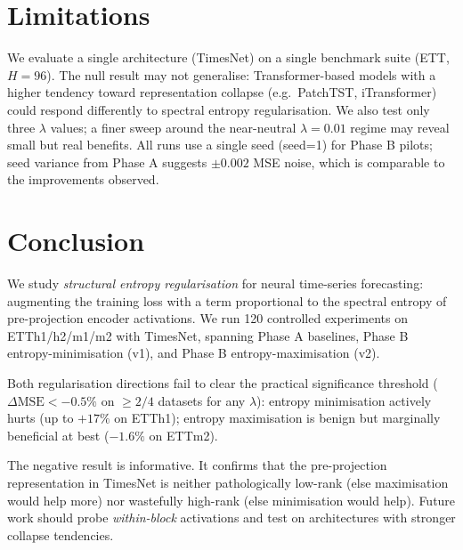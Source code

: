 \documentclass[10pt]{article}
\begin{document}
\section{Limitations}

We evaluate a single architecture (TimesNet) on a single benchmark suite
(ETT, $H=96$). The null result may not generalise: Transformer-based models
with a higher tendency toward representation collapse (e.g.\ PatchTST, iTransformer)
could respond differently to spectral entropy regularisation.
We also test only three $\lambda$ values; a finer sweep around the
near-neutral $\lambda=0.01$ regime may reveal small but real benefits.
All runs use a single seed (seed=1) for Phase B pilots; seed variance from
Phase A suggests $\pm0.002$ MSE noise, which is comparable to the improvements
observed.

\section{Conclusion}

We study \emph{structural entropy regularisation} for neural time-series
forecasting: augmenting the training loss with a term proportional to the
spectral entropy of pre-projection encoder activations.
We run 120 controlled experiments on ETTh1/h2/m1/m2 with TimesNet,
spanning Phase A baselines, Phase B entropy-minimisation (v1), and
Phase B entropy-maximisation (v2).

Both regularisation directions fail to clear the practical significance
threshold ($\Delta\text{MSE} < -0.5\%$ on $\geq\!2/4$ datasets for any
$\lambda$): entropy minimisation actively hurts (up to $+17\%$ on ETTh1);
entropy maximisation is benign but marginally beneficial at best ($-1.6\%$
on ETTm2).

The negative result is informative.
It confirms that the pre-projection representation in TimesNet is neither
pathologically low-rank (else maximisation would help more) nor wastefully
high-rank (else minimisation would help).
Future work should probe \emph{within-block} activations and test on
architectures with stronger collapse tendencies.



\end{document}
